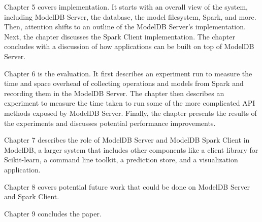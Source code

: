 Chapter 5 covers implementation. It starts with an overall view of the system,
including ModelDB Server, the database, the model filesystem, Spark, and more. 
Then, attention shifts to an outline of the ModelDB Server's implementation. Next,
the chapter discusses the Spark Client implementation. The chapter concludes with
a discussion of how applications can be built on top of ModelDB Server.

Chapter 6 is the evaluation. It first describes an experiment run to measure the
time and space overhead of collecting operations and models from Spark and recording
them in the ModelDB Server. The chapter then describes an experiment to measure
the time taken to run some of the more complicated API methods exposed by ModelDB Server.
Finally, the chapter presents the results of the experiments and discusses potential performance
improvements.

Chapter 7 describes the role of ModelDB Server and ModelDB Spark Client in ModelDB,
a larger system that includes other components like a client library for Scikit-learn,
a command line toolkit, a prediction store, and a visualization application.

Chapter 8 covers potential future work that could be done on ModelDB Server and Spark Client.

Chapter 9 concludes the paper.
